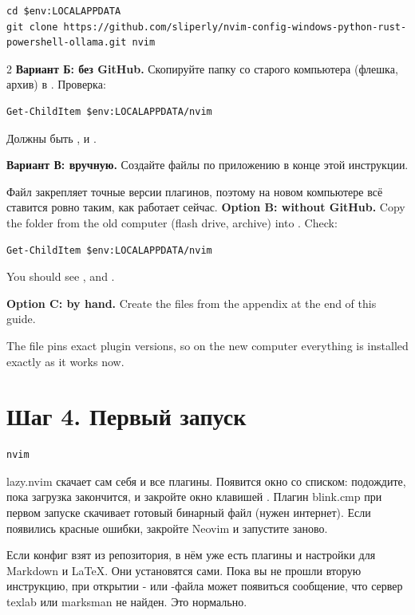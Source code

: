 \wide
\begin{lstlisting}
cd $env:LOCALAPPDATA
git clone https://github.com/sliperly/nvim-config-windows-python-rust-powershell-ollama.git nvim
\end{lstlisting}
\narrow

\begin{paracol}{2}
\RU
\textbf{Вариант Б: без GitHub.} Скопируйте папку  со старого компьютера (флешка, архив) в . Проверка:
\begin{lstlisting}
Get-ChildItem $env:LOCALAPPDATA/nvim
\end{lstlisting}
Должны быть ,  и .

\textbf{Вариант В: вручную.} Создайте файлы по приложению в конце этой инструкции.

Файл  закрепляет точные версии плагинов, поэтому на новом компьютере всё ставится ровно таким, как работает сейчас.
\switchcolumn
\EN
\textbf{Option B: without GitHub.} Copy the  folder from the old computer (flash drive, archive) into . Check:
\begin{lstlisting}
Get-ChildItem $env:LOCALAPPDATA/nvim
\end{lstlisting}
You should see ,  and .

\textbf{Option C: by hand.} Create the files from the appendix at the end of this guide.

The file  pins exact plugin versions, so on the new computer everything is installed exactly as it works now.
\switchcolumn*

\RU
\section*{Шаг 4. Первый запуск}
\begin{lstlisting}
nvim
\end{lstlisting}
lazy.nvim скачает сам себя и все плагины. Появится окно со списком: подождите, пока загрузка закончится, и закройте окно клавишей . Плагин blink.cmp при первом запуске скачивает готовый бинарный файл (нужен интернет). Если появились красные ошибки, закройте Neovim и запустите заново.

Если конфиг взят из репозитория, в нём уже есть плагины и настройки для Markdown и LaTeX. Они установятся сами. Пока вы не прошли вторую инструкцию, при открытии - или -файла может появиться сообщение, что сервер texlab или marksman не найден. Это нормально.
\switchcolumn
\EN

\end{paracol}
